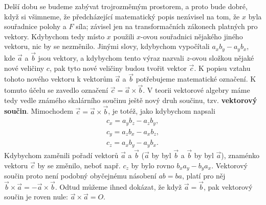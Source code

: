     Delší dobu se budeme zabývat trojrozměmým prostorem, a proto bude dobré, když si všimneme, že
    předcházející matematický popis nezávisel na tom, že \(x\) byla souřadnice polohy a \(F\) síla;
    závisel jen na transformačních zákonech platných pro vektory. Kdybychom tedy místo \(x\) použili
    \(x\)-ovou souřadnici nějakého jiného vektoru, nic by se nezměnilo. Jinými slovy, kdybychom
    vypočítali \(a_xb_y - a_yb_x\), kde \(\vec{a}\) a \(\vec{b}\) jsou vektory, a kdybychom tento
    výraz nazvali \(z\)-ovou složkou nějaké nové veličiny \(c\), pak tyto nové veličiny budou tvořit
    vektor \(\vec{c}\). K popisu vztahu tohoto nového vektoru k vektorům \(\vec{a}\) a \(\vec{b}\)
    potřebujeme matematické označení. K tomuto účelu se zavedlo označení \(\vec{c} = \vec{a} \times
    \vec{b}\). V teorii vektorové algebry máme tedy vedle známého skalárního součinu ještě nový druh
    součinu, tzv. \textbf{vektorový součin}. Mimochodem \(\vec{c} = \vec{a} \times \vec{b}\), je
    totéž, jako kdybychom napsali
    \begin{subequations}\label{fyz:eq718}
      \begin{align}
        c_x =a_yb_z−a_zb_y,    \label{fyz:eq718a}  \\
        c_y =a_zb_x−a_xb_z,    \label{fyz:eq718b}  \\
        c_z =a_xb_y−a_yb_x.    \label{fyz:eq718c}
      \end{align}
    \end{subequations}
    Kdybychom zaměnili pořadí vektorů \(\vec{a}\) a \(\vec{b}\) (\(\vec{a}\) by byl \(\vec{b}\) a
    \(\vec{b}\) by byl \(\vec{a}\)), znaménko vektoru \(\vec{c}\) by se změnilo, neboť např. \(c_z\)
    by bylo rovno \(b_xa_y - b_ya_x\). Vektorový součin proto není podobný obyčejnému násobení \(ab=
    ba\), platí pro něj \(\vec{b}\times\vec{a}=−\vec{a}\times\vec{b}\). Odtud můžeme ihned dokázat,
    že když \(\vec{a} = \vec{b}\), pak vektorový součin je roven nule: \(\vec{a}\times\vec{a} = O\).

